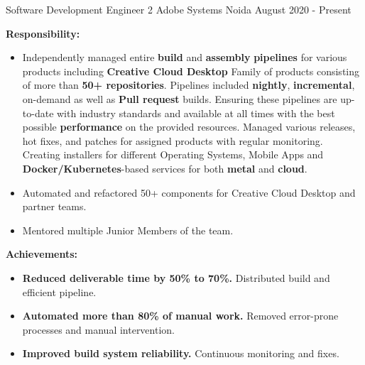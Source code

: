 

\begin{cventries}
\vspace{-1mm}

\cventry
    {Software Development Engineer 2} %
    {Adobe Systems} %
    {Noida} %
    {August 2020 - Present} %
    {
        \vspace{-4mm}
        \item \textbf{Responsibility:} 
        \begin{itemize}
            \item Independently managed entire \textbf{build} and \textbf{assembly} \textbf{pipelines} for various products including \textbf{Creative Cloud Desktop} Family of products consisting of more than \textbf{50+ repositories}. Pipelines included \textbf{nightly}, \textbf{incremental}, on-demand as well as \textbf{Pull request} builds. Ensuring these pipelines are up-to-date with industry standards and available at all times with the best possible \textbf{performance} on the provided resources. Managed various releases, hot fixes, and patches for assigned products with regular monitoring. Creating installers for different Operating Systems, Mobile Apps and \textbf{Docker/Kubernetes}-based services for both \textbf{metal} and \textbf{cloud}.
            \item Automated and refactored 50+ components for Creative Cloud Desktop and partner teams.
            \item Mentored multiple Junior Members of the team.
        \end{itemize}
        \item \textbf{Achievements:}
        \begin{itemize}
            \item \textbf{Reduced deliverable time by 50\% to 70\%.} Distributed build and efficient pipeline.
            \item \textbf{Automated more than 80\% of manual work.} Removed error-prone processes and manual intervention.
            \item \textbf{Improved build system reliability.} Continuous monitoring and fixes.

\end{itemize}}
\end{cventries}
